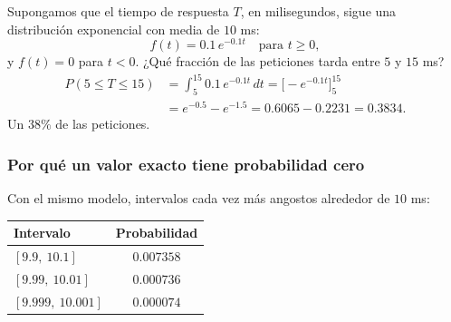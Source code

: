 \documentclass[11pt,letterpaper]{article}
\begin{document}
\begin{ejemplo}
    Supongamos que el tiempo de respuesta $T$, en milisegundos, sigue
    una distribución exponencial con media de $10$ ms:
    \[
        f(t) = 0.1\, e^{-0.1 t} \quad \text{para } t \ge 0 ,
    \]
    y $f(t) = 0$ para $t < 0$. ¿Qué fracción de las peticiones tarda
    entre $5$ y $15$ ms?
    \begin{align*}
        P(5 \le T \le 15)
            &= \int_{5}^{15} 0.1\, e^{-0.1 t}\, dt
             = \Big[ -e^{-0.1 t} \Big]_{5}^{15} \\
            &= e^{-0.5} - e^{-1.5}
             = 0.6065 - 0.2231 = 0.3834 .
    \end{align*}
    Un $38\%$ de las peticiones.
    \begin{center}
    \end{center}
\end{ejemplo}

\subsubsection*{Por qué un valor exacto tiene probabilidad cero}

Con el mismo modelo, intervalos cada vez más angostos alrededor de
$10$ ms:

\begin{center}
\begin{tabular}{lc}
    \toprule
    \textbf{Intervalo} & \textbf{Probabilidad} \\
    \midrule
    $[9.9,\ 10.1]$     & $0.007358$ \\
    $[9.99,\ 10.01]$   & $0.000736$ \\
    $[9.999,\ 10.001]$ & $0.000074$ \\
    \bottomrule
\end{tabular}
\end{center}
\end{document}
